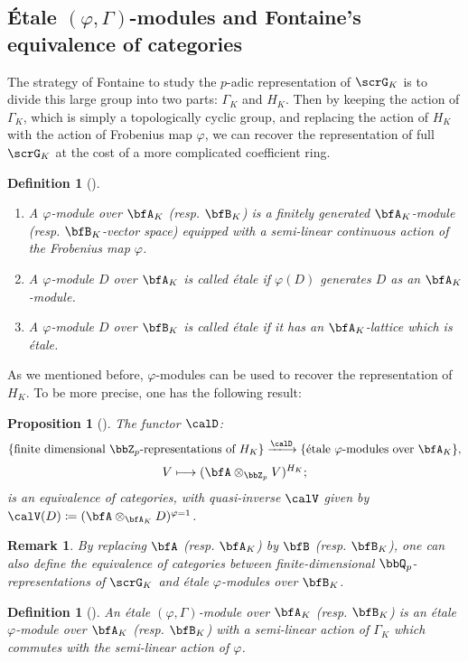 \documentclass[a4paper,oneside]{amsart}
\newtheorem{remark}[theorem]{Remark}
\newtheorem{proposition}[theorem]{Proposition}
\newtheorem{definition}[theorem]{Definition}
\numberwithin{equation}{section}
\numberwithin{figure}{section}
\begin{document}
\subsection{\'Etale $(\varphi,\Gamma)$-modules and Fontaine's equivalence of categories}
The strategy of Fontaine to study the $p$-adic representation of $\scrG_K$ is to divide this large group into two parts: $\Gamma_K$ and $H_K$. Then by keeping the action of $\Gamma_K$, which is simply a topologically cyclic group, and replacing the action of $H_K$ with the action of Frobenius map $\varphi$, we can recover the representation of full $\scrG_K$ at the cost of a more complicated coefficient ring.
\begin{definition}[{\cite{Fontaine2007}}]\leavevmode
    \begin{enumerate}
        \item A $\varphi$-module over $\bfA_K$ (resp. $\bfB_K$) is a finitely generated $\bfA_K$-module (resp. $\bfB_K$-vector space) equipped with a semi-linear continuous action of the Frobenius map $\varphi$.
        \item A $\varphi$-module $D$ over $\bfA_K$ is called \'etale if $\varphi(D)$ generates $D$ as an $\bfA_K$-module.
        \item A $\varphi$-module $D$ over $\bfB_K$ is called \'etale if it has an $\bfA_K$-lattice which is \'etale.
    \end{enumerate}
\end{definition}
As we mentioned before, $\varphi$-modules can be used to recover the representation of $H_K$. To be more precise, one has the following result:
\begin{proposition}[{\cite[Proposition 1.2.6]{Fontaine2007}}]\label{thm:44873}
    The functor $\calD$:
    $$\{\text{finite dimensional }\bbZ_p\text{-representations of }H_K\}\xlto{\calD} \{\text{\'etale } \varphi\text{-modules over }\bfA_K\},$$
    $$V\longmapsto (\bfA\otimes_{\bbZ_p} V)^{H_K};$$
    is an equivalence of categories, with quasi-inverse $\calV$ given by $\calV(D)\coloneqq (\bfA\otimes_{\bfA_K} D)^{\varphi=1}$.
\end{proposition}
\begin{remark}\label{rmk:44018}
    By replacing $\bfA$ (resp. $\bfA_K$) by $\bfB$ (resp. $\bfB_K$), one can also define the equivalence of categories between finite-dimensional $\bbQ_p$-representations of $\scrG_K$ and \'etale $\varphi$-modules over $\bfB_K$.
\end{remark}
\begin{definition}[{\cite{Fontaine2007}}]
    An \'etale $(\varphi,\Gamma)$-module over $\bfA_K$ (resp. $\bfB_K$) is an \'etale $\varphi$-module over $\bfA_K$ (resp. $\bfB_K$) with a semi-linear action of $\Gamma_K$ which commutes with the semi-linear action of $\varphi$.
\end{definition}
\end{document}
